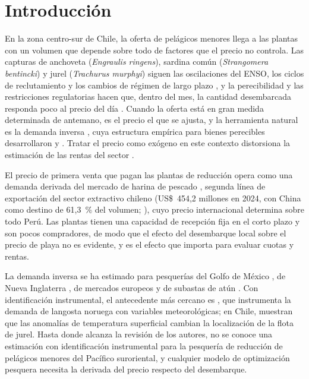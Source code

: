 \documentclass[11pt]{article}
\begin{document}
\section{Introducción}\label{sec:intro}
En la zona centro-sur de Chile, la oferta de pelágicos menores llega a las plantas con un volumen que depende sobre todo de factores que el precio no controla. Las capturas de anchoveta (\textit{Engraulis ringens}), sardina común (\textit{Strangomera bentincki}) y jurel (\textit{Trachurus murphyi}) siguen las oscilaciones del ENSO, los ciclos de reclutamiento y los cambios de régimen de largo plazo \parencite{alheit2004, chavez2003}, y la perecibilidad y las restricciones regulatorias hacen que, dentro del mes, la cantidad desembarcada responda poco al precio del día \parencite{dresdner2014}. Cuando la oferta está en gran medida determinada de antemano, es el precio el que se ajusta, y la herramienta natural es la demanda inversa \parencite{anderson1980}, cuya estructura empírica para bienes perecibles desarrollaron \textcite{barten1989} y \textcite{eales1994}. Tratar el precio como exógeno en este contexto distorsiona la estimación de las rentas del sector \parencite{gordon2015}.

El precio de primera venta que pagan las plantas de reducción opera como una demanda derivada del mercado de harina de pescado \parencite{asche2002}, segunda línea de exportación del sector extractivo chileno (US\$~454,2 millones en 2024, con China como destino de 61,3~\% del volumen; \cite{SUBPESCA2025informe}), cuyo precio internacional determina sobre todo Perú. Las plantas tienen una capacidad de recepción fija en el corto plazo \parencite{dresdner2014} y son pocos compradores, de modo que el efecto del desembarque local sobre el precio de playa no es evidente, y es el efecto que importa para evaluar cuotas y rentas.

La demanda inversa se ha estimado para pesquerías del Golfo de México \parencite{beach2001, park2004}, de Nueva Inglaterra \parencite{lee2013}, de mercados europeos \parencite{klonaris2009, thong2012} y de subastas de atún \parencite{sun2017, sun2019}. Con identificación instrumental, el antecedente más cercano es \textcite{hammarlund2022wind}, que instrumenta la demanda de langosta noruega con variables meteorológicas; en Chile, \textcite{penatorres2017} muestran que las anomalías de temperatura superficial cambian la localización de la flota de jurel. Hasta donde alcanza la revisión de los autores, no se conoce una estimación con identificación instrumental para la pesquería de reducción de pelágicos menores del Pacífico suroriental, y cualquier modelo de optimización pesquera necesita la derivada del precio respecto del desembarque.
\end{document}

